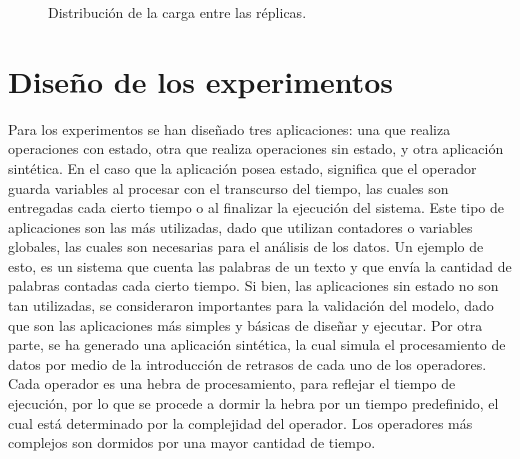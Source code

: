 \begin{figure}[!ht]
	\caption{Distribución de la carga entre las réplicas.}
	\label{fig:distCarga}
\end{figure}



\section{Diseño de los experimentos}
Para los experimentos se han diseñado tres aplicaciones: una que realiza operaciones con estado, otra que realiza operaciones sin estado, y otra aplicación sintética. En el caso que la aplicación posea estado, significa que el operador guarda variables al procesar con el transcurso del tiempo, las cuales son entregadas cada cierto tiempo o al finalizar la ejecución del sistema. Este tipo de aplicaciones son las más utilizadas, dado que utilizan contadores o variables globales, las cuales son necesarias para el análisis de los datos. Un ejemplo de esto, es un sistema que cuenta las palabras de un texto y que envía la cantidad de palabras contadas cada cierto tiempo. Si bien, las aplicaciones sin estado no son tan utilizadas, se consideraron importantes para la validación del modelo, dado que son las aplicaciones más simples y básicas de diseñar y ejecutar. Por otra parte, se ha generado una aplicación sintética, la cual simula el procesamiento de datos por medio de la introducción de retrasos de cada uno de los operadores. Cada operador es una hebra de procesamiento, para reflejar el tiempo de ejecución, por lo que se procede a dormir la hebra por un tiempo predefinido, el cual está determinado por la complejidad del operador. Los operadores más complejos son dormidos por una mayor cantidad de tiempo.



